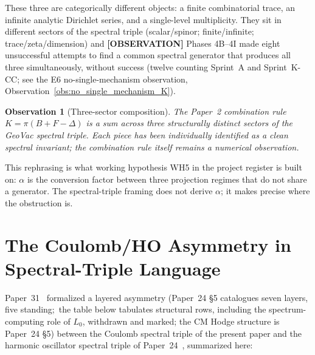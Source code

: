 \documentclass[11pt]{article}
\newtheorem{observation}{Observation}
\begin{document}
These three are categorically different objects: a finite
combinatorial trace, an infinite analytic Dirichlet series, and a
single-level multiplicity.  They sit in different sectors of the
spectral triple (scalar/spinor; finite/infinite; trace/zeta/dimension)
and \textbf{[OBSERVATION]} Phases 4B--4I made eight unsuccessful attempts to find a common spectral
generator that produces all three simultaneously, without success
(twelve counting Sprint~A and Sprint~K-CC; see the E6
no-single-mechanism observation, Observation~\ref{obs:no_single_mechanism_K}).

\begin{observation}[Three-sector composition]
\label{obs:three_sector}
The Paper~2 combination rule $K = \pi(B + F - \Delta)$ is a sum across
three structurally distinct sectors of the GeoVac spectral triple.
Each piece has been individually identified as a clean spectral
invariant; the combination rule itself remains a numerical observation.
\end{observation}

This rephrasing is what working hypothesis WH5 in the project register
is built on: $\alpha$ is the conversion factor between three projection
regimes that do not share a generator.  The spectral-triple framing
does not derive $\alpha$; it makes precise where the obstruction is.


\section{The Coulomb/HO Asymmetry in Spectral-Triple Language}
\label{sec:coulomb_ho}

Paper~31~\cite{paper31} formalized a layered asymmetry (Paper~24
\S 5 catalogues seven layers, five standing;\ the table below
tabulates structural rows, including the spectrum-computing role of
$L_0$, withdrawn and marked; the
CM Hodge structure is Paper~24 \S 5) between the
Coulomb spectral triple of the present paper and the harmonic
oscillator spectral triple of Paper~24~\cite{paper24}, summarized
here:
\end{document}
